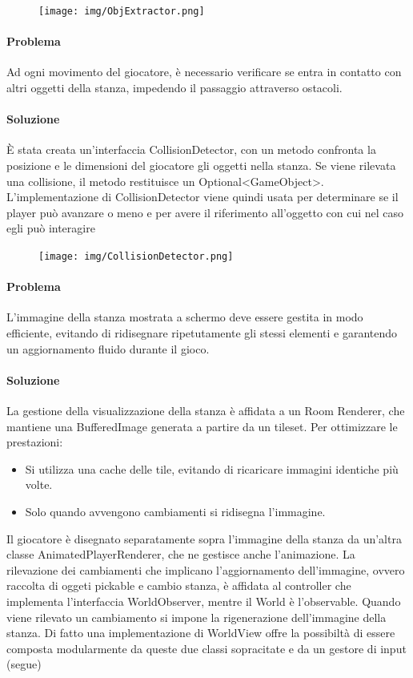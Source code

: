 \documentclass[a4paper,12pt]{report}
\begin{document}
\begin{figure}[h]
    \centering
    \texttt{[image: img/ObjExtractor.png]}
    \label{img:ObjectExtractor}
\end{figure}


\paragraph{Problema} %
Ad ogni movimento del giocatore, è necessario verificare se entra in contatto con altri oggetti della stanza, impedendo il passaggio attraverso ostacoli.
\paragraph{Soluzione} %
È stata creata un'interfaccia CollisionDetector, con un metodo confronta la posizione e le dimensioni del giocatore gli oggetti nella stanza. Se viene rilevata una collisione, il metodo restituisce un Optional<GameObject>.
L'implementazione di CollisionDetector viene quindi usata per determinare se il player può avanzare o meno e per avere il riferimento all'oggetto con cui nel caso egli può interagire
\begin{figure}[h]
    \centering
    \texttt{[image: img/CollisionDetector.png]}
    \label{img:ObjectExtractor}
\end{figure}

\paragraph{Problema} %
L’immagine della stanza mostrata a schermo deve essere gestita in modo efficiente, evitando di ridisegnare ripetutamente gli stessi elementi e garantendo un aggiornamento fluido durante il gioco.
\paragraph{Soluzione} %
La gestione della visualizzazione della stanza è affidata a un Room Renderer, che mantiene una BufferedImage generata a partire da un tileset. Per ottimizzare le prestazioni:
\begin{itemize}
    \item Si utilizza una cache delle tile, evitando di ricaricare immagini identiche più volte.
    \item Solo quando avvengono cambiamenti si ridisegna l’immagine.
\end{itemize}
Il giocatore è disegnato separatamente sopra l’immagine della stanza da un’altra classe AnimatedPlayerRenderer, che ne gestisce anche l’animazione. 
La rilevazione dei cambiamenti che implicano l’aggiornamento dell’immagine, ovvero raccolta di oggeti pickable e cambio stanza, è affidata al controller che implementa l’interfaccia WorldObserver, mentre il World è l'observable.
Quando viene rilevato un cambiamento si impone la rigenerazione dell'immagine della stanza.
Di fatto una implementazione di WorldView offre la possibiltà di essere composta modularmente da queste due classi sopracitate e da un gestore di input (segue)
\end{document}
